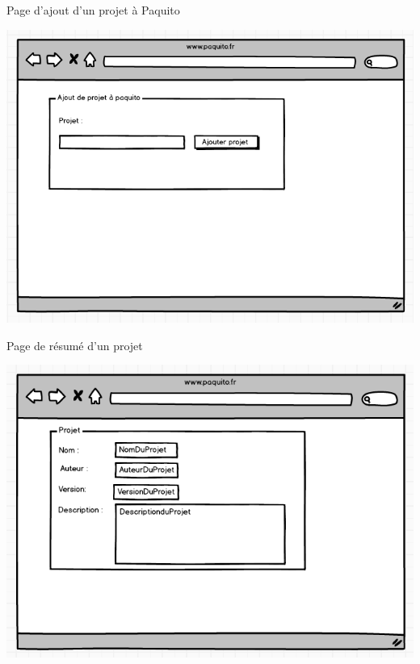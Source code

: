 \documentclass[11pt,xcolor=dvipsnames]{beamer}
\begin{document}
\begin{frame}{Page d'ajout d'un projet à Paquito}
	\begin{center}
		\includegraphics[scale=\largeur]{../img/maquette_2.png}
	\end{center}
\end{frame}

\begin{frame}{Page de résumé d'un projet}
	\begin{center}
		\includegraphics[scale=\largeur]{../img/maquette_3.png}
	\end{center}
\end{frame}
\end{document}
